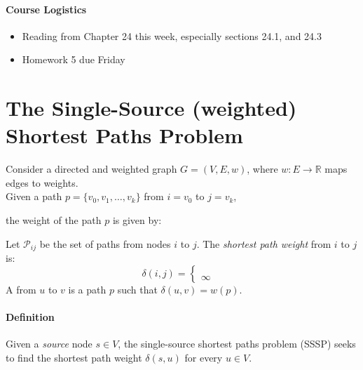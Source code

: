 \documentclass[11  pt]{exam}
\begin{document}
	
	
	\paragraph{Course Logistics}
	\begin{itemize}
		\item Reading from Chapter 24 this week, especially sections 24.1, and 24.3
		\item Homework 5 due Friday
	\end{itemize}
	
	\section{The Single-Source (weighted) Shortest Paths Problem}
	Consider a directed and weighted graph $G = (V,E, w)$, where $w \colon E \rightarrow \mathbb{R}$ maps edges to weights.\\
	
	Given a path $p = \{v_0, v_1, \hdots , v_k\}$ from $i = v_0$ to $j = v_k$, 
	
	\vs{2.5cm}
	
	
	the weight of the path $p$ is given by: 
\vs{3cm}
	
	Let $\mathcal{P}_{ij}$ be the set of paths from nodes $i$ to $j$. The \emph{shortest path weight} from $i$ to $j$ is:
	\begin{equation*}
		\delta(i,j) = \begin{cases}
		 \\  \\%
			\infty & %
		\end{cases}
	\end{equation*}
	A  from $u$ to $v$ is a path $p$ such that $\delta(u,v) = w(p)$. \\
	
	\paragraph{Definition} Given a \emph{source} node $s \in V$, the single-source shortest paths problem (SSSP) seeks to find the shortest path weight $\delta(s,u)$ for every $u \in V$.
	
\end{document}
